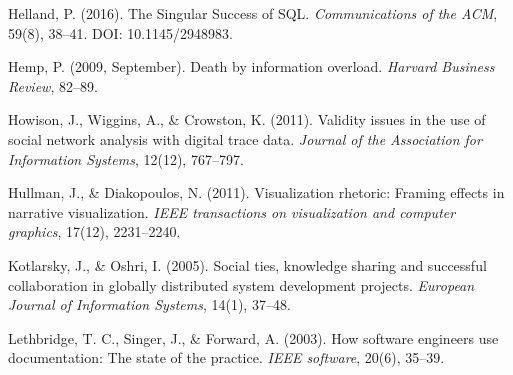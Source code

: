 \documentclass[11pt]{article}
\begin{document}
\begin{description}
\item Helland, P. (2016). The Singular Success of SQL. \textit{Communications of the ACM}, 59(8), 38--41. DOI: 10.1145/2948983.
\item Hemp, P. (2009, September). Death by information overload. \textit{Harvard Business Review}, 82--89.
\item Howison, J., Wiggins, A., \& Crowston, K. (2011). Validity issues in the use of social network analysis with digital trace data. \textit{Journal of the Association for Information Systems}, 12(12), 767--797.
\item Hullman, J., \& Diakopoulos, N. (2011). Visualization rhetoric: Framing effects in narrative visualization. \textit{IEEE transactions on visualization and computer graphics}, 17(12), 2231--2240.
\item Kotlarsky, J., \& Oshri, I. (2005). Social ties, knowledge sharing and successful collaboration in globally distributed system development projects. \textit{European Journal of Information Systems}, 14(1), 37--48.
\item Lethbridge, T. C., Singer, J., \& Forward, A. (2003). How software engineers use documentation: The state of the practice. \textit{IEEE software}, 20(6), 35--39.

\end{description}
\end{document}
